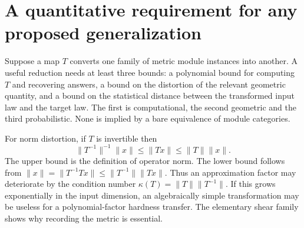 \section{A quantitative requirement for any proposed generalization}
Suppose a map $T$ converts one family of metric module instances into another. A useful reduction needs at least three bounds: a polynomial bound for computing $T$ and recovering answers, a bound on the distortion of the relevant geometric quantity, and a bound on the statistical distance between the transformed input law and the target law. The first is computational, the second geometric and the third probabilistic. None is implied by a bare equivalence of module categories.

For norm distortion, if $T$ is invertible then
\[
 \|T^{-1}\|^{-1}\|x\|\le\|Tx\|\le\|T\|\|x\|.
\]
The upper bound is the definition of operator norm. The lower bound follows from
$\|x\|=\|T^{-1}Tx\|\le\|T^{-1}\|\|Tx\|$.
Thus an approximation factor may deteriorate by the condition number
$\kappa(T)=\|T\|\|T^{-1}\|$. If this grows exponentially in the input dimension, an algebraically simple transformation may be useless for a polynomial-factor hardness transfer. The elementary shear family shows why recording the metric is essential.
